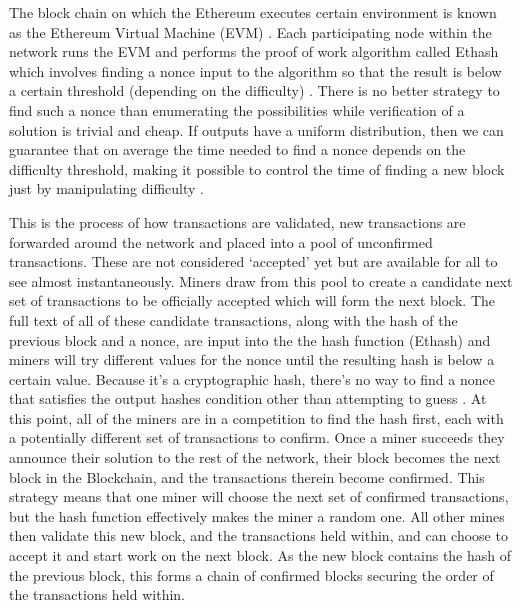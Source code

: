 \documentclass{article}
\begin{document}
The block chain on which the Ethereum executes certain environment is known as the Ethereum Virtual Machine (EVM) \citep{54_ethereum_explained_2017}. Each participating node within the network runs the EVM and performs the proof of work algorithm called Ethash which involves finding a nonce input to the algorithm so that the result is below a certain threshold (depending on the difficulty) \citep{57_introduction_ethereum_frontier_guide_2017}. There is no better strategy to find such a nonce than enumerating the possibilities while verification of a solution is trivial and cheap. If outputs have a uniform distribution, then we can guarantee that on average the time needed to find a nonce depends on the difficulty threshold, making it possible to control the time of finding a new block just by manipulating difficulty \citep{57_introduction_ethereum_frontier_guide_2017}.

This is the process of how transactions are validated, new transactions are forwarded around the network and placed into a pool of unconfirmed transactions. These are not considered `accepted' yet but are available for all to see almost instantaneously. Miners draw from this pool to create a candidate next set of transactions to be officially accepted which will form the next block. The full text of all of these candidate transactions, along with the hash of the previous block and a nonce, are input into the the hash function (Ethash) and miners will try different values for the nonce until the resulting hash is below a certain value. Because it's a cryptographic hash, there's no way to find a nonce that satisfies the output hashes condition other than attempting to guess \citep{20_developer_guide_bitcoin_2016}. At this point, all of the miners are in a competition to find the hash first, each with a potentially different set of transactions to confirm. Once a miner succeeds they announce their solution to the rest of the network, their block becomes the next block in the Blockchain, and the transactions therein become confirmed. This strategy means that one miner will choose the next set of confirmed transactions, but the hash function effectively makes the miner a random one. All other mines then validate this new block, and the transactions held within, and can choose to accept it and start work on the next block. As the new block contains the hash of the previous block, this forms a chain of confirmed blocks securing the order of the transactions held within.
\end{document}
